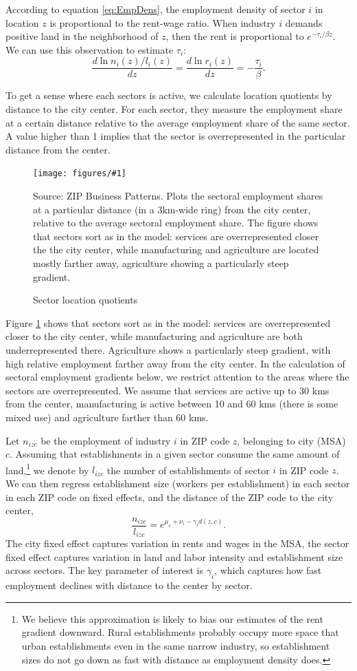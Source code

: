 \documentclass[12pt]{article}
\newcommand{\dofigure}[3]{\begin{figure}
\begin{centering}
\texttt{[image: figures/\#1]}
  \caption{#2\label{fig:#1}}
\end{centering}

\noindent \footnotesize{#3}
\end{figure}}
\begin{document}
According to equation \ref{eq:EmpDens}, the employment density of sector $i$ in location $z$ is proportional to the rent-wage ratio. When industry $i$ demands positive land in the neighborhood of $z$, then the rent is proportional to $e^{-\tau_i/\beta z}$. We can use this observation to estimate $\tau_i$:
\[
\frac{d\ln n_i(z)/l_i(z)}{dz} =\frac{d\ln r_i(z)}{dz} = -\frac{\tau_i}{\beta}.
\]

To get a sense where each sectors is active, we calculate location quotients by distance to the city center. For each sector, they measure the employment share at a certain distance relative to the average employment share of the same sector. A value higher than 1 implies that the sector is overrepresented in the particular distance from the center.

\dofigure{sector_location_quotients}{Sector location quotients}{Source: ZIP Business Patterns. Plots the sectoral employment shares at a particular distance (in a 3km-wide ring) from the city center, relative to the average sectoral employment share. The figure shows that sectors sort as in the model: services are overrepresented closer the the city center, while manufacturing and agriculture are located mostly farther away, agriculture showing a particularly steep gradient.}

Figure \ref{fig:sector_location_quotients} shows that sectors sort as in the model: services are overrepresented closer to the city center, while manufacturing and agriculture are both underrepresented there. Agriculture shows a particularly steep gradient, with high relative employment farther away from the city center. In the calculation of sectoral employment gradients below, we restrict attention to the areas where the sectors are overrepresented. We assume that services are active up to 30 kms from the center, manufacturing is active between 10 and 60 kms (there is some mixed use) and agriculture farther than 60 kms.

Let $n_{izc}$ be the employment of industry $i$ in ZIP code $z$, belonging to city (MSA) $c$.  Assuming that establishments in a given sector consume the same amount of land,\footnote{We believe this approximation is likely to bias our estimates of the rent gradient downward. Rural establishments probably occupy more space that urban establishments even in the same narrow industry, so establishment sizes do not go down as fast with distance as employment density does. } we denote by $l_{izc}$ the number of establishments of sector $i$ in ZIP code $z$. We can then regress establishment size (workers per establishment) in each sector in each ZIP code on fixed effects, and the distance of the ZIP code to the city center,
\begin{equation}\label{eq:estimable:gradient}
\frac{n_{izc}}{l_{izc}} = e^{\mu_c+\nu_i-\gamma_i d(z,c)}.
\end{equation}
The city fixed effect captures variation in rents and wages in the MSA, the sector fixed effect captures variation in land and labor intensity and establishment size across sectors. %
The key parameter of interest is $\gamma_i$, which captures how fast employment declines with distance to the center by sector.
\end{document}
